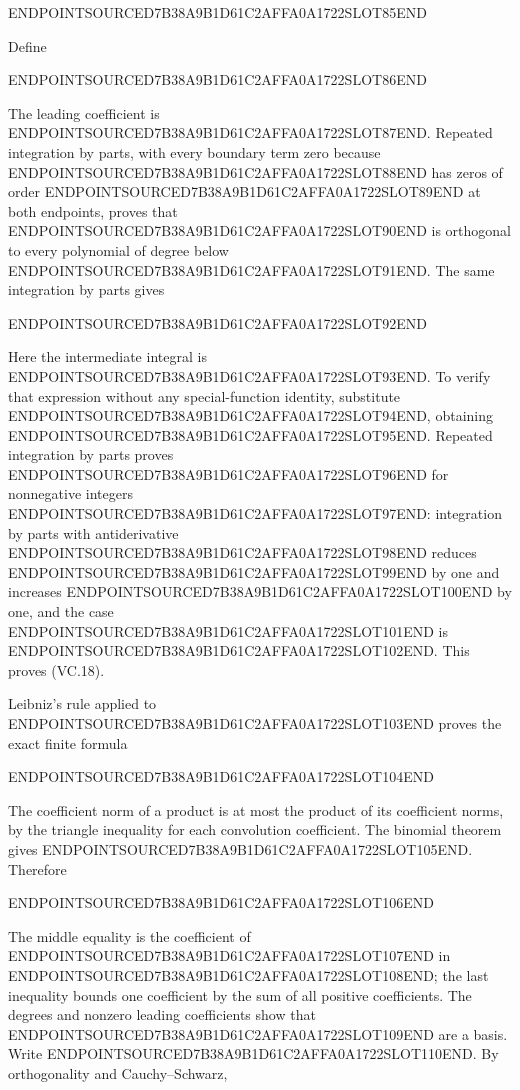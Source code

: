 ENDPOINTSOURCED7B38A9B1D61C2AFFA0A1722SLOT85END

Define

ENDPOINTSOURCED7B38A9B1D61C2AFFA0A1722SLOT86END

The leading coefficient is ENDPOINTSOURCED7B38A9B1D61C2AFFA0A1722SLOT87END. Repeated integration by parts, with every boundary term zero because ENDPOINTSOURCED7B38A9B1D61C2AFFA0A1722SLOT88END has zeros of order ENDPOINTSOURCED7B38A9B1D61C2AFFA0A1722SLOT89END at both endpoints, proves that ENDPOINTSOURCED7B38A9B1D61C2AFFA0A1722SLOT90END is orthogonal to every polynomial of degree below ENDPOINTSOURCED7B38A9B1D61C2AFFA0A1722SLOT91END. The same integration by parts gives

ENDPOINTSOURCED7B38A9B1D61C2AFFA0A1722SLOT92END

Here the intermediate integral is ENDPOINTSOURCED7B38A9B1D61C2AFFA0A1722SLOT93END. To verify that expression without any special-function identity, substitute ENDPOINTSOURCED7B38A9B1D61C2AFFA0A1722SLOT94END, obtaining ENDPOINTSOURCED7B38A9B1D61C2AFFA0A1722SLOT95END. Repeated integration by parts proves ENDPOINTSOURCED7B38A9B1D61C2AFFA0A1722SLOT96END for nonnegative integers ENDPOINTSOURCED7B38A9B1D61C2AFFA0A1722SLOT97END: integration by parts with antiderivative ENDPOINTSOURCED7B38A9B1D61C2AFFA0A1722SLOT98END reduces ENDPOINTSOURCED7B38A9B1D61C2AFFA0A1722SLOT99END by one and increases ENDPOINTSOURCED7B38A9B1D61C2AFFA0A1722SLOT100END by one, and the case ENDPOINTSOURCED7B38A9B1D61C2AFFA0A1722SLOT101END is ENDPOINTSOURCED7B38A9B1D61C2AFFA0A1722SLOT102END. This proves (VC.18).

Leibniz's rule applied to ENDPOINTSOURCED7B38A9B1D61C2AFFA0A1722SLOT103END proves the exact finite formula

ENDPOINTSOURCED7B38A9B1D61C2AFFA0A1722SLOT104END

The coefficient norm of a product is at most the product of its coefficient norms, by the triangle inequality for each convolution coefficient. The binomial theorem gives ENDPOINTSOURCED7B38A9B1D61C2AFFA0A1722SLOT105END. Therefore

ENDPOINTSOURCED7B38A9B1D61C2AFFA0A1722SLOT106END

The middle equality is the coefficient of ENDPOINTSOURCED7B38A9B1D61C2AFFA0A1722SLOT107END in ENDPOINTSOURCED7B38A9B1D61C2AFFA0A1722SLOT108END; the last inequality bounds one coefficient by the sum of all positive coefficients. The degrees and nonzero leading coefficients show that ENDPOINTSOURCED7B38A9B1D61C2AFFA0A1722SLOT109END are a basis. Write ENDPOINTSOURCED7B38A9B1D61C2AFFA0A1722SLOT110END. By orthogonality and Cauchy--Schwarz,

